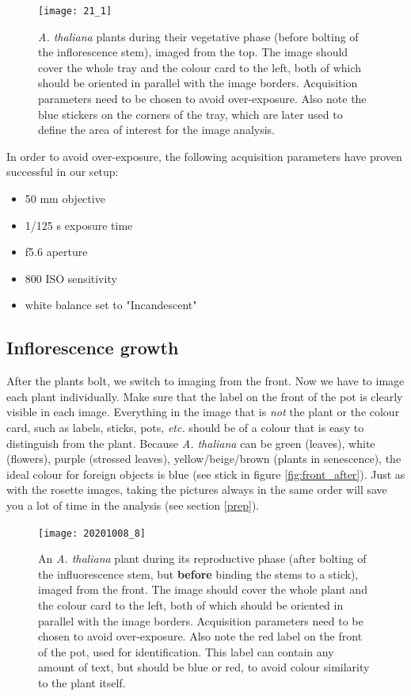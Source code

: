 \documentclass[10pt]{article}
\begin{document}
 	\begin{figure}[!h]
 		\centering
 		\texttt{[image: 21\_1]}
 		\caption[Example image of a top-view image.]{\textit{A. thaliana} plants during their vegetative phase (before bolting of the inflorescence stem), imaged from the top. The image should cover the whole tray and the colour card to the left, both of which should be oriented in parallel with the image borders. Acquisition parameters need to be chosen to avoid over-exposure. Also note the blue stickers on the corners of the tray, which are later used to define the area of interest for the image analysis.}
 		\label{fig:top}
 	\end{figure}
 
 	\noindent In order to avoid over-exposure, the following acquisition parameters have proven successful in our setup:
 
	 \begin{itemize}
	 	\item 50 mm objective
	 	\item 1/125 s exposure time
	 	\item f5.6 aperture
	 	\item 800 ISO sensitivity
	 	\item white balance set to "Incandescent"
	 \end{itemize}
 
 	\subsection{Inflorescence growth}
 	
 	After the plants bolt, we switch to imaging from the front. Now we have to image each plant individually. Make sure that the label on the front of the pot is clearly visible in each image. Everything in the image that is \textit{not} the plant or the colour card, such as labels, sticks, pots, \textit{etc.} should be of a colour that is easy to distinguish from the plant. Because \textit{A. thaliana} can be green (leaves), white (flowers), purple (stressed leaves), yellow/beige/brown (plants in senescence), the ideal colour for foreign objects is blue (see stick in figure \ref{fig:front_after}). Just as with the rosette images, taking the pictures always in the same order will save you a lot of time in the analysis (see section \ref{prep}).
 	
 	\begin{figure}[!h]
 		\centering
 		\texttt{[image: 20201008\_8]}
 		\caption[Example image of a front-view image.]{An \textit{A. thaliana} plant during its reproductive phase (after bolting of the influorescence stem, but \textbf{before} binding the stems to a stick), imaged from the front. The image should cover the whole plant and the colour card to the left, both of which should be oriented in parallel with the image borders. Acquisition parameters need to be chosen to avoid over-exposure. Also note the red label on the front of the pot, used for identification. This label can contain any amount of text, but should be blue or red, to avoid colour similarity to the plant itself.}
 		\label{fig:front_before}
 	\end{figure}
 
\end{document}

